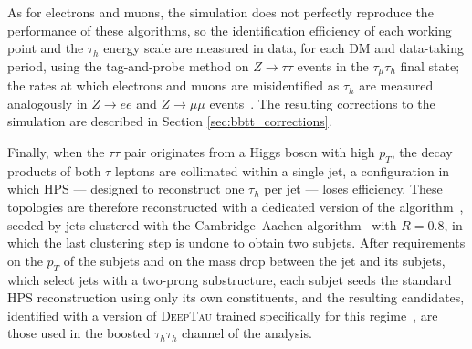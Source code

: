 As for electrons and muons, the simulation does not perfectly reproduce the performance of these algorithms, so the identification efficiency of each working point and the $\tau_h$ energy scale are measured in data, for each DM and data-taking period, using the tag-and-probe method on $Z\to\tau\tau$ events in the $\tau_\mu\tau_h$ final state; the rates at which electrons and muons are misidentified as $\tau_h$ are measured analogously in $Z\to ee$ and $Z\to\mu\mu$ events~\cite{CMS-TAU-24-001}. The resulting corrections to the simulation are described in Section \ref{sec:bbtt_corrections}.


Finally, when the $\tau\tau$ pair originates from a Higgs boson with high $p_T$, the decay products of both $\tau$ leptons are collimated within a single jet, a configuration in which HPS — designed to reconstruct one $\tau_h$ per jet — loses efficiency. These topologies are therefore reconstructed with a dedicated version of the algorithm~\cite{CMS:2015fjg,CMS-TAU-16-003}, seeded by jets clustered with the Cambridge–Aachen algorithm~\cite{Dokshitzer:1997in,Wobisch:1998wt} with $R=0.8$, in which the last clustering step is undone to obtain two subjets. After requirements on the $p_T$ of the subjets and on the mass drop between the jet and its subjets, which select jets with a two-prong substructure, each subjet seeds the standard HPS reconstruction using only its own constituents, and the resulting candidates, identified with a version of \textsc{DeepTau} trained specifically for this regime~\cite{CMS-DP-2025-047}, are those used in the boosted $\tau_h\tau_h$ channel of the analysis.


